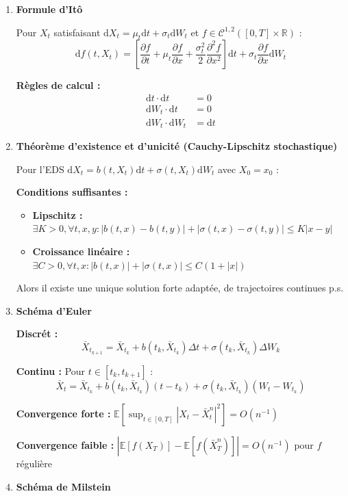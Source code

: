 \documentclass[12pt,a4paper]{article}
\theoremstyle{definition}
\theoremstyle{remark}
\newcommand{\R}{\mathbb{R}}
\newcommand{\E}{\mathbb{E}}
\newcommand{\dd}{\mathrm{d}}
\begin{document}
\begin{enumerate}
\item \textbf{Formule d'Itô}

Pour $X_t$ satisfaisant $\dd X_t = \mu_t \dd t + \sigma_t \dd W_t$ et $f \in \mathcal{C}^{1,2}([0,T] \times \R)$ :
\[
\dd f(t, X_t) = \left[\frac{\partial f}{\partial t} + \mu_t \frac{\partial f}{\partial x} + \frac{\sigma_t^2}{2}\frac{\partial^2 f}{\partial x^2}\right]\dd t + \sigma_t \frac{\partial f}{\partial x}\dd W_t
\]

\textbf{Règles de calcul :}
\begin{align*}
\dd t \cdot \dd t &= 0 \\
\dd W_t \cdot \dd t &= 0 \\
\dd W_t \cdot \dd W_t &= \dd t
\end{align*}

\item \textbf{Théorème d'existence et d'unicité (Cauchy-Lipschitz stochastique)}

Pour l'EDS $\dd X_t = b(t,X_t)\dd t + \sigma(t,X_t)\dd W_t$ avec $X_0 = x_0$ :

\textbf{Conditions suffisantes :}
\begin{itemize}
\item \textbf{Lipschitz :} $\exists K > 0, \forall t,x,y : |b(t,x)-b(t,y)| + |\sigma(t,x)-\sigma(t,y)| \leq K|x-y|$
\item \textbf{Croissance linéaire :} $\exists C > 0, \forall t,x : |b(t,x)| + |\sigma(t,x)| \leq C(1+|x|)$
\end{itemize}

Alors il existe une unique solution forte adaptée, de trajectoires continues p.s.

\item \textbf{Schéma d'Euler}

\textbf{Discrét :}
\[
\bar{X}_{t_{k+1}} = \bar{X}_{t_k} + b(t_k, \bar{X}_{t_k})\Delta t + \sigma(t_k, \bar{X}_{t_k})\Delta W_k
\]

\textbf{Continu :} Pour $t \in [t_k, t_{k+1}]$ :
\[
\bar{X}_t = \bar{X}_{t_k} + b(t_k, \bar{X}_{t_k})(t-t_k) + \sigma(t_k, \bar{X}_{t_k})(W_t - W_{t_k})
\]

\textbf{Convergence forte :} $\E[\sup_{t \in [0,T]} |X_t - \bar{X}_t^n|^2] = O(n^{-1})$

\textbf{Convergence faible :} $|\E[f(X_T)] - \E[f(\bar{X}_T^n)]| = O(n^{-1})$ pour $f$ régulière

\item \textbf{Schéma de Milstein}


\end{enumerate}
\end{document}
